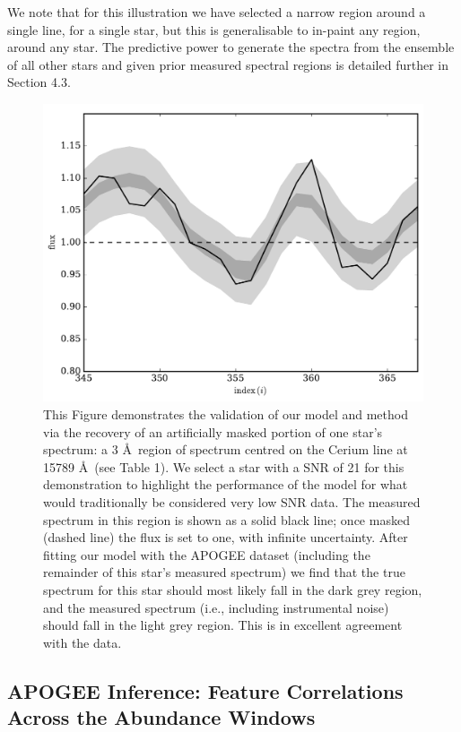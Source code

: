 \documentclass[a4paper,fleqn,usenatbib]{mnras}
\begin{document}
We note that for this illustration we have selected a narrow region around a single line, for a single star, but this is generalisable to in-paint any region, around any star. The predictive power to generate the spectra from the ensemble of all other stars and given prior measured spectral regions is detailed further in Section 4.3. 


\begin{figure}
	\includegraphics[width=\columnwidth]{apogee_centers_final_29502_spc_rec_test_recovery_zoom.pdf}
    \caption{This Figure demonstrates the validation of our model and method via the recovery of an artificially masked portion of one star's spectrum: a 3 \AA\ region of spectrum centred on the Cerium line at 15789 \AA\ (see Table 1). We select a star with a SNR of 21 for this demonstration to highlight the performance of the model for what would traditionally be considered very low SNR data. The measured spectrum in this region is shown as a solid black line; once masked (dashed line) the flux is set to one, with infinite uncertainty. After fitting our model with the APOGEE dataset (including the remainder of this star's measured spectrum) we find that the true spectrum for this star should most likely fall in the dark grey region, and the measured spectrum (i.e., including instrumental noise) should fall in the light grey region. This is in excellent agreement with the data.}
    \label{fig:recovery_test}
\end{figure}

\subsection{APOGEE Inference: Feature Correlations Across the Abundance Windows}
\end{document}
